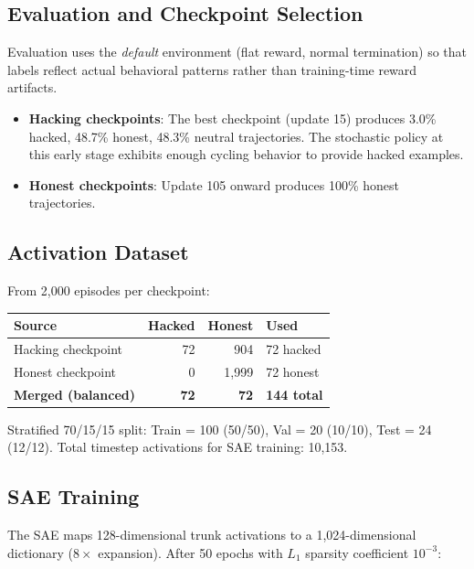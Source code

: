 \documentclass[11pt]{article}
\begin{document}
\subsection{Evaluation and Checkpoint Selection}

Evaluation uses the \emph{default} environment (flat reward, normal termination) so that labels reflect actual behavioral patterns rather than training-time reward artifacts.

\begin{itemize}[nosep]
  \item \textbf{Hacking checkpoints}: The best checkpoint (update 15) produces 3.0\% hacked, 48.7\% honest, 48.3\% neutral trajectories.  The stochastic policy at this early stage exhibits enough cycling behavior to provide hacked examples.
  \item \textbf{Honest checkpoints}: Update 105 onward produces 100\% honest trajectories.
\end{itemize}

\subsection{Activation Dataset}

From 2{,}000 episodes per checkpoint:

\begin{center}
\begin{tabular}{lrrl}
\toprule
Source & Hacked & Honest & Used \\
\midrule
Hacking checkpoint & 72 & 904 & 72 hacked \\
Honest checkpoint & 0 & 1{,}999 & 72 honest \\
\midrule
\textbf{Merged (balanced)} & \textbf{72} & \textbf{72} & \textbf{144 total} \\
\bottomrule
\end{tabular}
\end{center}

Stratified 70/15/15 split: Train = 100 (50/50), Val = 20 (10/10), Test = 24 (12/12).  Total timestep activations for SAE training: 10{,}153.

\subsection{SAE Training}

The SAE maps 128-dimensional trunk activations to a 1{,}024-dimensional dictionary ($8\times$ expansion).  After 50 epochs with $L_1$ sparsity coefficient $10^{-3}$:
\end{document}

